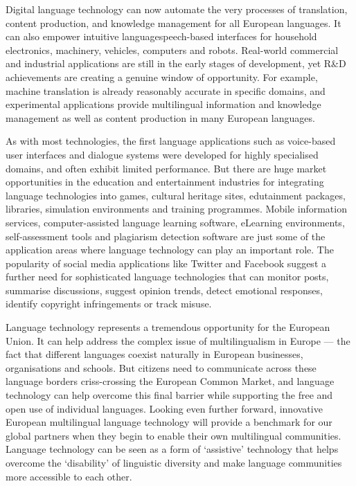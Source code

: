 \documentclass{scrartcl}
\begin{document}
\begin{Parallel}[c]{70mm}{70mm}
{    Digital language technology can now automate the very processes of translation, content production, and knowledge management for all European languages. It can also empower intuitive language\/speech-based interfaces for household electronics, machinery, vehicles, computers and robots. Real-world commercial and industrial applications are still in the early stages of development, yet R\&D achievements are creating a genuine window of opportunity. For example, machine translation is already reasonably accurate in specific domains, and experimental applications provide multilingual information and knowledge management as well as content production in many European languages.

    As with most technologies, the first language applications such as voice-based user interfaces and dialogue systems were developed for highly specialised domains, and often exhibit limited performance. But there are huge market opportunities in the education and entertainment industries for integrating language technologies into games, cultural heritage sites, edutainment packages, libraries, simulation environments and training programmes. Mobile information services, computer-assisted language learning software, eLearning environments, self-assessment tools and plagiarism detection software are just some of the application areas where language technology can play an important role. The popularity of social media applications like Twitter and Facebook suggest a further need for sophisticated language technologies that can monitor posts, summarise discussions, suggest opinion trends, detect emotional responses, identify copyright infringements or track misuse.

    Language technology represents a tremendous opportunity for the European Union. It can help address the complex issue of multilingualism in Europe --- the fact that different languages coexist naturally in European businesses, organisations and schools. But citizens need to communicate across these language borders criss-crossing the European Common Market, and language technology can help overcome this final barrier while supporting the free and open use of individual languages. Looking even further forward, innovative European multilingual language technology will provide a benchmark for our global partners when they begin to enable their own multilingual communities. Language technology can be seen as a form of `assistive' technology that helps overcome the `disability' of linguistic diversity and make language communities more accessible to each other.

}
\end{Parallel}
\end{document}
